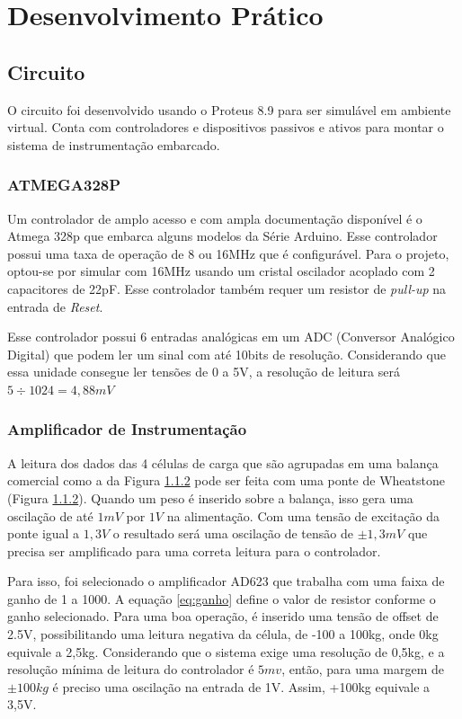 \documentclass[a4paper, 12pt]{article}
\begin{document}
	\section{Desenvolvimento Prático}
	
	\subsection{Circuito}
	O circuito foi desenvolvido usando o Proteus 8.9 para ser simulável em ambiente virtual. Conta com controladores e dispositivos passivos e ativos para montar o sistema de instrumentação embarcado.  
	
	\subsubsection{ATMEGA328P}
	Um controlador de amplo acesso e com ampla documentação disponível é o Atmega 328p que embarca alguns modelos da Série Arduino. Esse controlador possui uma taxa de operação de 8 ou 16MHz que é configurável. Para o projeto, optou-se por simular com 16MHz usando um cristal oscilador acoplado com 2 capacitores de 22pF. Esse controlador também requer um resistor  de \textit{pull-up} na entrada de \textit{Reset}.
	
	Esse controlador possui 6 entradas analógicas em um ADC (Conversor Analógico Digital) que podem ler um sinal com até 10bits de resolução. Considerando que essa unidade consegue ler tensões de 0 a 5V, a resolução de leitura será $ 5\div 1024 = 4,88mV  $
	
	\subsubsection{Amplificador de Instrumentação}
	A leitura dos dados das 4 células de carga que são agrupadas em uma balança comercial como a da Figura \ref{} pode ser feita com uma ponte de Wheatstone (Figura \ref{}). Quando um peso é inserido sobre a balança, isso gera uma oscilação de até $ 1mV $ por $ 1V $ na alimentação. Com uma tensão de excitação da ponte igual a $ 1,3V $ o resultado será uma oscilação de tensão de $ \pm 1,3mV $ que precisa ser amplificado para uma correta leitura para o controlador. 
	
	Para isso, foi selecionado o amplificador AD623 que trabalha com uma faixa de ganho de 1 a 1000. A equação \ref{eq:ganho} define o valor de resistor conforme o ganho selecionado. Para uma boa operação, é inserido uma tensão de offset de 2.5V, possibilitando uma leitura negativa da célula, de -100 a 100kg, onde 0kg equivale a 2,5kg. Considerando que o sistema exige uma resolução de 0,5kg, e a resolução mínima de leitura do controlador é $ 5mv $, então, para uma margem de $ \pm100kg $ é preciso uma oscilação na entrada de 1V. Assim, +100kg equivale a 3,5V.
	
\end{document}
